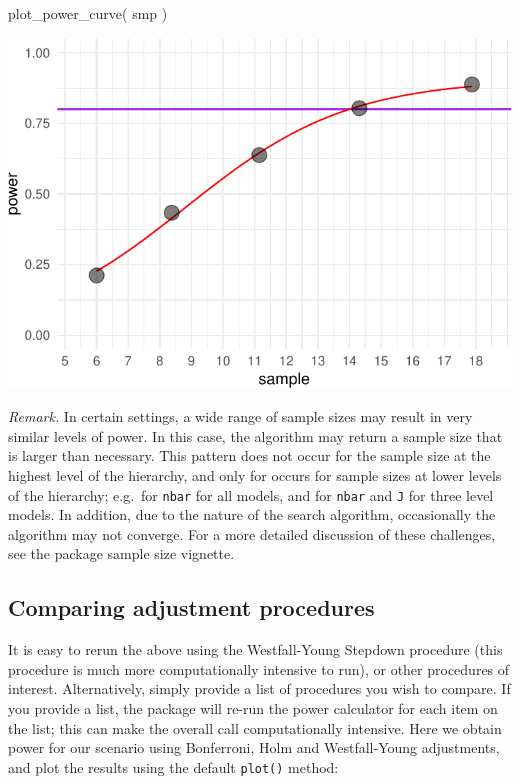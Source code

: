 \documentclass{article}
\newenvironment{Shaded}{\begin{snugshade}}{\end{snugshade}}
\newcommand{\FunctionTok}[1]{\textcolor[rgb]{0.00,0.00,0.00}{#1}}
\newcommand{\NormalTok}[1]{#1}
\begin{document}
\begin{Shaded}
\begin{Highlighting}[]
\FunctionTok{plot\_power\_curve}\NormalTok{( smp )}
\end{Highlighting}
\end{Shaded}

\begin{center}\includegraphics{plotsamplepowercurve-1} \end{center}

\emph{Remark.} In certain settings, a wide range of sample sizes may
result in very similar levels of power. In this case, the algorithm may
return a sample size that is larger than necessary. This pattern does
not occur for the sample size at the highest level of the hierarchy, and
only for occurs for sample sizes at lower levels of the hierarchy;
e.g.~for \texttt{nbar} for all models, and for \texttt{nbar} and
\texttt{J} for three level models. In addition, due to the nature of the
search algorithm, occasionally the algorithm may not converge. For a
more detailed discussion of these challenges, see the package sample
size vignette.

\subsection{Comparing adjustment procedures}

It is easy to rerun the above using the Westfall-Young Stepdown
procedure (this procedure is much more computationally intensive to
run), or other procedures of interest. Alternatively, simply provide a
list of procedures you wish to compare. If you provide a list, the
package will re-run the power calculator for each item on the list; this
can make the overall call computationally intensive. Here we obtain
power for our scenario using Bonferroni, Holm and Westfall-Young
adjustments, and plot the results using the default \texttt{plot()}
method:
\end{document}
